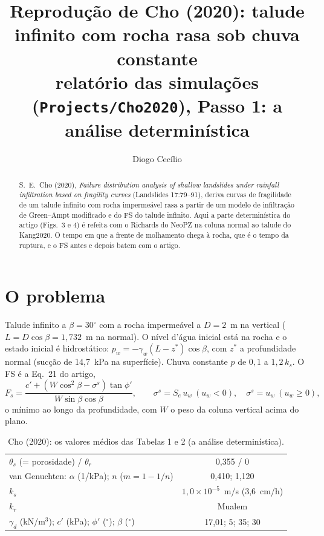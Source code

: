\documentclass[11pt,a4paper]{article}
\title{Reprodução de Cho (2020): talude infinito com rocha rasa sob chuva constante\\
\large relatório das simulações (\texttt{Projects/Cho2020}), Passo 1: a análise determinística}
\author{Diogo Cecílio}
\date{\versao}
\begin{document}
\maketitle

\begin{abstract}
S.~E.~Cho (2020), \emph{Failure distribution analysis of shallow landslides under rainfall infiltration based on
fragility curves} (Landslides 17:79--91), deriva curvas de fragilidade de um talude infinito com rocha impermeável
rasa a partir de um modelo de infiltração de Green--Ampt modificado e do FS do talude infinito. Aqui a parte
determinística do artigo (Figs.~3 e 4) é refeita com o Richards do NeoPZ na coluna normal ao talude do Kang2020. O tempo
em que a frente de molhamento chega à rocha, que é o tempo da ruptura, e o FS antes e depois batem com o artigo.
\end{abstract}

\tableofcontents

\section{O problema}
Talude infinito a $\beta = 30^\circ$ com a rocha impermeável a $D = 2$~m na vertical ($L = D\cos\beta = 1{,}732$~m na
normal). O nível d'água inicial está na rocha e o estado inicial é hidrostático: $p_w = -\gamma_w (L - z^*)\cos\beta$,
com $z^*$ a profundidade normal (sucção de 14,7~kPa na superfície). Chuva constante $p$ de $0{,}1$ a $1{,}2\,k_s$. O FS
é a Eq.~21 do artigo,
\[
F_s = \frac{c' + (W\cos^2\beta - \sigma^s)\tan\phi'}{W\sin\beta\cos\beta},\qquad \sigma^s = S_e\,u_w \ (u_w < 0),\quad
\sigma^s = u_w \ (u_w \geq 0),
\]
o mínimo ao longo da profundidade, com $W$ o peso da coluna vertical acima do plano.

\begin{table}[H]\centering\small
\caption{Cho (2020): os valores médios das Tabelas 1 e 2 (a análise determinística).}
\begin{tabular}{lc}
\toprule
$\theta_s$ (= porosidade) / $\theta_r$ & 0,355 / 0\\
van Genuchten: $\alpha$ (1/kPa); $n$ ($m = 1 - 1/n$) & 0,410; 1,120\\
$k_s$ & $1{,}0\times10^{-5}$~m/s (3,6~cm/h)\\
$k_r$ & Mualem\\
$\gamma_d$ (kN/m$^3$); $c'$ (kPa); $\phi'$ ($^\circ$); $\beta$ ($^\circ$) & 17,01; 5; 35; 30\\
\bottomrule
\end{tabular}
\end{table}
\end{document}
